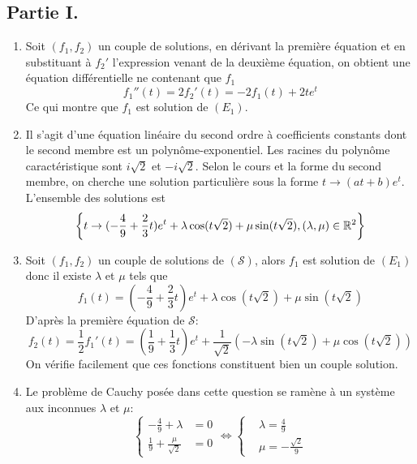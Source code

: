 \subsection*{Partie I.}
\begin{enumerate}
 \item Soit $(f_1,f_2)$ un couple de solutions, en dérivant la première équation et en substituant à $f_2'$ l'expression venant de la deuxième équation, on obtient une équation différentielle ne contenant que $f_1$
\begin{displaymath}
 f_1''(t) = 2f_2'(t)=-2f_1(t)+2te^{t}
\end{displaymath}
Ce qui montre que $f_1$ est solution de $(E_1)$.
 \item Il s'agit d'une équation linéaire du second ordre à coefficients constants dont le second membre est un polynôme-exponentiel. Les racines du polynôme caractéristique sont $i\sqrt{2}$ et $-i\sqrt{2}$. Selon le cours et la forme du second membre, on cherche une solution particulière sous la forme $t\rightarrow (at+b)e^{t}$. L'ensemble des solutions est
\begin{displaymath}
 \left\lbrace
t\rightarrow ( -\frac{4}{9}+ \frac{2}{3}t)e^t+\lambda \cos(t\sqrt{2})+ \mu \sin(t\sqrt{2}),
(\lambda,\mu)\in \mathbb{R}^2
 \right\rbrace 
\end{displaymath}

 \item Soit $(f_1,f_2)$ un couple de solutions de $(\mathcal S)$, alors $f_1$ est solution de $(E_1)$ donc il existe $\lambda$ et $\mu$ tels que
\begin{displaymath}
 f_1(t) = ( -\frac{4}{9}+ \frac{2}{3}t)e^t+\lambda \cos(t\sqrt{2})+ \mu \sin(t\sqrt{2})
\end{displaymath}
D'après la première équation de $\mathcal{S}$:
\begin{displaymath}
 f_2(t) = \frac{1}{2}f_1'(t) = (\frac{1}{9}+\frac{1}{3}t)e^t + \frac{1}{\sqrt{2}}(-\lambda \sin(t\sqrt{2})+ \mu \cos(t\sqrt{2}))
\end{displaymath}
On vérifie facilement que ces fonctions constituent bien un couple solution.
 \item  Le problème de Cauchy posée dans cette question se ramène à un système aux inconnues $\lambda$ et $\mu$:
\begin{displaymath}
 \left\lbrace 
\begin{aligned}
 -\frac{4}{9}+\lambda &= 0 \\ \frac{1}{9}+\frac{\mu}{\sqrt{2}} &= 0
\end{aligned}
\right. 
\Leftrightarrow
\left\lbrace 
\begin{aligned}
 &\lambda = \frac{4}{9} \\ &\mu = -\frac{\sqrt{2}}{9}
\end{aligned}
\right.
\end{displaymath} 
\end{enumerate}

